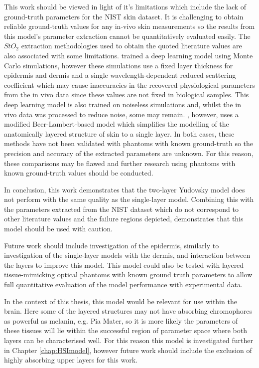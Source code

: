 This work should be viewed in light of it's limitations which include the lack of ground-truth parameters for the NIST skin dataset. It is challenging to obtain reliable ground-truth values for any in-vivo skin measurements so the results from this model's parameter extraction cannot be quantitatively evaluated easily. The $StO_2$ extraction methodologies used to obtain the quoted literature values are also associated with some limitations. \cite{Nishidate2011} trained a deep learning model using Monte Carlo simulations, however these simulations use a fixed layer thickness for epidermis and dermis and a single wavelength-dependent reduced scattering coefficient which may cause inaccuracies in the recovered physiological parameters from the in vivo data since these values are not fixed in biological samples. This deep learning model is also trained on noiseless simulations and, whilst the in vivo data was processed to reduce noise, some may remain. \cite{VanManen2021}, however, uses a modified Beer-Lambert-based model which simplifies the modelling of the anatomically layered structure of skin to a single layer. In both cases, these methods have not been validated with phantoms with known ground-truth so the precision and accuracy of the extracted parameters are unknown. For this reason, these comparisons may be flawed and further research using phantoms with known ground-truth values should be conducted.

In conclusion, this work demonstrates that the two-layer Yudovsky model does not perform with the same quality as the single-layer model. Combining this with the parameters extracted from the NIST dataset which do not correspond to other literature values and the failure regions depicted, demonstrates that this model should be used with caution. 

Future work should include investigation of the epidermis, similarly to investigation of the single-layer models with the dermis, and interaction between the layers to improve this model. This model could also be tested with layered tissue-mimicking optical phantoms with known ground truth parameters to allow full quantitative evaluation of the model performance with experimental data. 

In the context of this thesis, this model would be relevant for use within the brain. Here some of the layered structures may not have absorbing chromophores as powerful as melanin, e.g. Pia Mater, so it is more likely the parameters of these tissues will lie within the successful region of parameter space where both layers can be characterised well. For this reason this model is investigated further in Chapter \ref{chap:HSImodel}, however future work should include the exclusion of highly absorbing upper layers for this work. 

% 
% 

% 

% 